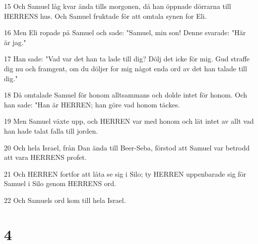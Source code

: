 \par 15 Och Samuel låg kvar ända tills morgonen, då han öppnade dörrarna till HERRENS hus. Och Samuel fruktade för att omtala synen for Eli.
\par 16 Men Eli ropade på Samuel och sade: "Samuel, min son! Denne svarade: "Här är jag."
\par 17 Han sade: "Vad var det han ta lade till dig? Dölj det icke för mig. Gud straffe dig nu och framgent, om du döljer for mig något enda ord av det han talade till dig."
\par 18 Då omtalade Samuel för honom alltsammans och dolde intet för honom. Och han sade: "Han är HERREN; han göre vad honom täckes.
\par 19 Men Samuel växte upp, och HERREN var med honom och lät intet av allt vad han hade talat falla till jorden.
\par 20 Och hela Israel, från Dan ända till Beer-Seba, förstod att Samuel var betrodd att vara HERRENS profet.
\par 21 Och HERREN fortfor att låta se sig i Silo; ty HERREN uppenbarade sig för Samuel i Silo genom HERRENS ord.
\par 22 Och Samuels ord kom till hela Israel.

\chapter{4}

